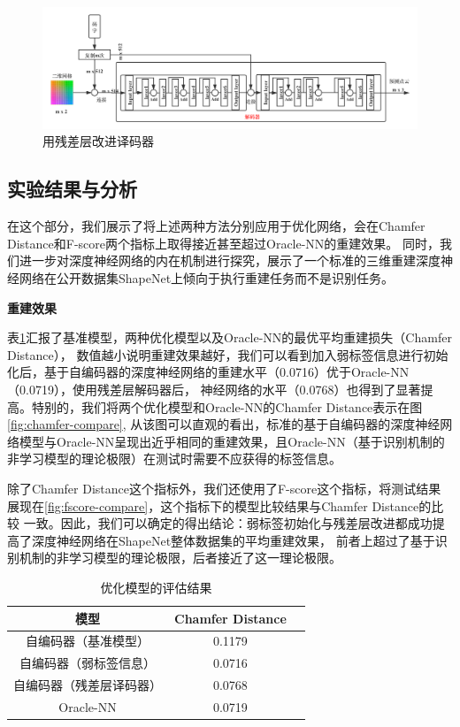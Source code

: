 \documentclass[bachelor, nocolorlinks, printoneside]{seuthesis} %
\begin{document}
\begin{Main}
\begin{figure}
    \centering
    \includegraphics[width=0.99\columnwidth]{figs/model/resnet_decoder.png}
    \caption{用残差层改进译码器}
    \label{fig:resnet_decoder}
\end{figure}

\FloatBarrier



\subsection{实验结果与分析}
\label{sec:shapenet_result}
在这个部分，我们展示了将上述两种方法分别应用于优化网络，会在Chamfer Distance和F-score两个指标上取得接近甚至超过Oracle-NN的重建效果。
同时，我们进一步对深度神经网络的内在机制进行探究，展示了一个标准的三维重建深度神经网络在公开数据集ShapeNet上倾向于执行重建任务而不是识别任务。

\noindent
\textbf{重建效果}

表\ref{table:metric_optimal_baseline}汇报了基准模型，两种优化模型以及Oracle-NN的最优平均重建损失（Chamfer Distance），
数值越小说明重建效果越好，我们可以看到加入弱标签信息进行初始化后，基于自编码器的深度神经网络的重建水平（0.0716）优于Oracle-NN（0.0719），使用残差层解码器后，
神经网络的水平（0.0768）也得到了显著提高。特别的，我们将两个优化模型和Oracle-NN的Chamfer Distance表示在图\ref{fig:chamfer-compare},
从该图可以直观的看出，标准的基于自编码器的深度神经网络模型与Oracle-NN呈现出近乎相同的重建效果，且Oracle-NN（基于识别机制的非学习模型的理论极限）在测试时需要不应获得的标签信息。

除了Chamfer Distance这个指标外，我们还使用了F-score这个指标，将测试结果展现在\ref{fig:fscore-compare}，这个指标下的模型比较结果与Chamfer Distance的比较
一致。因此，我们可以确定的得出结论：弱标签初始化与残差层改进都成功提高了深度神经网络在ShapeNet整体数据集的平均重建效果，
前者上超过了基于识别机制的非学习模型的理论极限，后者接近了这一理论极限。

\begin{table}
    \centering
    \caption{优化模型的评估结果}
    \begin{tabular}{ccc} 
    \hline
    模型                      & Chamfer Distance \\
    \hline
    自编码器（基准模型）            & 0.1179     \\
    自编码器（弱标签信息）           & 0.0716                             \\
    自编码器（残差层译码器）         & 0.0768                         \\
    Oracle-NN & 0.0719                           \\ 
    \hline
    \end{tabular}
    \label{table:metric_optimal_baseline}
\end{table}


\end{Main}
\end{document}
